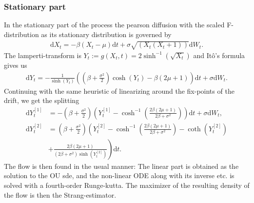 \subsubsection{Stationary part}
In the stationary part of the process the pearson diffusion with the scaled F-distribution as its stationary distribution is governed by
\begin{align}
    \mathrm{d}X_t = -\beta\left(X_t - \mu\right)\mathrm{d}t + \sigma \sqrt{\left(X_t\left(X_t + 1\right)\right)}\mathrm{d}W_t.
\end{align}
The lamperti-transform is $Y_t := g(X_t, t) = 2 \sinh^{-1}\left(\sqrt{X_t}\right)$ and Itô's formula gives us
\begin{align}
    \mathrm{d}Y_t = - \frac{1}{\sinh(Y_t)}\left(\left(\beta + \frac{\sigma^2}{2}\right)\cosh(Y_t) - \beta\left(2\mu + 1\right)\right) \mathrm{d}t + \sigma \mathrm{d}W_t.
\end{align}
Continuing with the same heuristic of linearizing around the fix-points of the drift, we get the splitting
\begin{align}
    \mathrm{d}Y_t^{[1]} &= -\left(\beta + \frac{\sigma^2}{2}\right)\left(Y_t^{[1]} - \cosh^{-1}\left(\frac{2\beta\left(2\mu + 1\right)}{2\beta + \sigma^2}\right)\right)\mathrm{d}t + \sigma \mathrm{d}W_t, \\
    \mathrm{d}Y_t^{[2]} &= \left(\beta + \frac{\sigma^2}{2}\right) \left(Y_t^{[2]} - \cosh^{-1}\left(\frac{2\beta\left(2\mu + 1\right)}{2\beta + \sigma^2}\right) - \coth\left(Y_t^{[2]}\right) \right.\nonumber\\
    &+ \left. \frac{2\beta\left(2\mu + 1\right)}{\left(2\beta + \sigma^2\right)\sinh(Y_t^{[2]})}\right)\mathrm{d}t.
\end{align}
The flow is then found in the usual manner: The linear part is obtained as the solution to the OU sde, and the non-linear ODE along with its inverse etc. is solved with a fourth-order Runge-kutta. The maximizer of the resulting density of the flow is then the Strang-estimator.  
